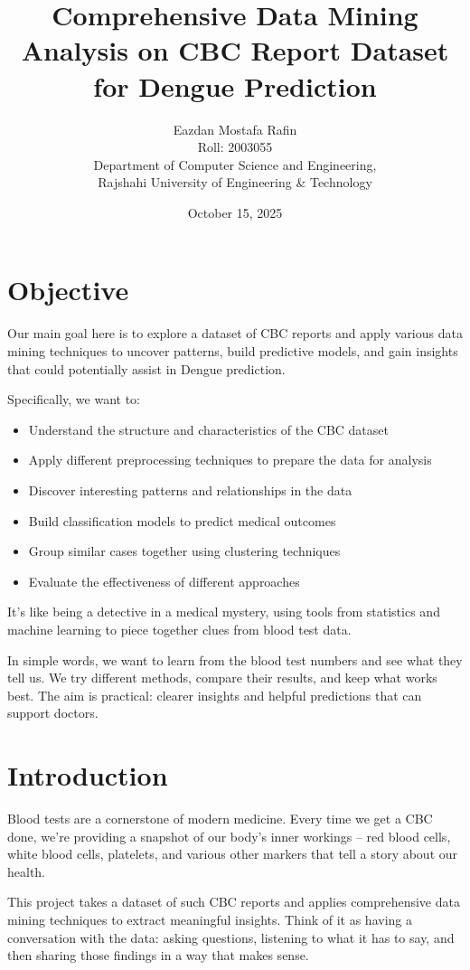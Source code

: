 \documentclass[12pt,a4paper]{article}
\title{Comprehensive Data Mining Analysis on CBC Report Dataset for Dengue Prediction}
\author{Eazdan Mostafa Rafin \\
Roll: 2003055 \\
Department of Computer Science and Engineering, \\Rajshahi University of Engineering \& Technology}
\date{October 15, 2025}
\begin{document}
\maketitle

\section{Objective}

Our main goal here is to explore a dataset of CBC reports and apply various data mining techniques to uncover patterns, build predictive models, and gain insights that could potentially assist in Dengue prediction.

Specifically, we want to:
\begin{itemize}
    \item Understand the structure and characteristics of the CBC dataset
    \item Apply different preprocessing techniques to prepare the data for analysis
    \item Discover interesting patterns and relationships in the data
    \item Build classification models to predict medical outcomes
    \item Group similar cases together using clustering techniques
    \item Evaluate the effectiveness of different approaches
\end{itemize}

It's like being a detective in a medical mystery, using tools from statistics and machine learning to piece together clues from blood test data.

In simple words, we want to learn from the blood test numbers and see what they tell us. We try different methods, compare their results, and keep what works best. The aim is practical: clearer insights and helpful predictions that can support doctors.

\section{Introduction}

Blood tests are a cornerstone of modern medicine. Every time we get a CBC done, we're providing a snapshot of our body's inner workings – red blood cells, white blood cells, platelets, and various other markers that tell a story about our health.

This project takes a dataset of such CBC reports and applies comprehensive data mining techniques to extract meaningful insights. Think of it as having a conversation with the data: asking questions, listening to what it has to say, and then sharing those findings in a way that makes sense.
\end{document}
